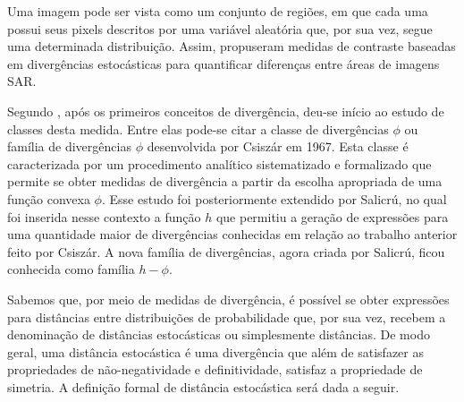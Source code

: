 \documentclass[12pt]{article}
\begin{document}
Uma imagem pode ser vista como um conjunto de regiões, em que cada uma possui seus pixels descritos por uma variável aleatória que, por sua vez, segue uma determinada distribuição. Assim, \citet{Nascimento2010} propuseram medidas de contraste baseadas em divergências estocásticas para quantificar diferenças entre áreas de imagens SAR. 

Segundo \citet{tese_abraao}, após os primeiros conceitos de divergência, deu-se início ao estudo de classes desta medida. Entre elas pode-se citar a classe de divergências $\phi$ ou família de divergências $\phi$ desenvolvida por Csiszár em 1967. Esta classe é caracterizada por um procedimento analítico sistematizado e formalizado que permite se obter medidas de divergência a partir da escolha apropriada de uma função convexa $\phi$. Esse estudo foi posteriormente extendido por Salicrú, no qual foi inserida nesse contexto a função $h$ que permitiu a geração de expressões para uma quantidade maior de divergências conhecidas em relação ao trabalho anterior feito por Csiszár. A nova família de divergências, agora criada por Salicrú, ficou conhecida como família $h - \phi$. 

Sabemos que, por meio de medidas de divergência, é possível se obter expressões para distâncias entre distribuições de probabilidade que, por sua vez, recebem a denominação de distâncias estocásticas ou simplesmente distâncias. De modo geral, uma distância estocástica é uma divergência que além de satisfazer as propriedades de não-negatividade e definitividade, satisfaz a propriedade de simetria. A definição formal de distância estocástica será dada a seguir. 
\end{document}
